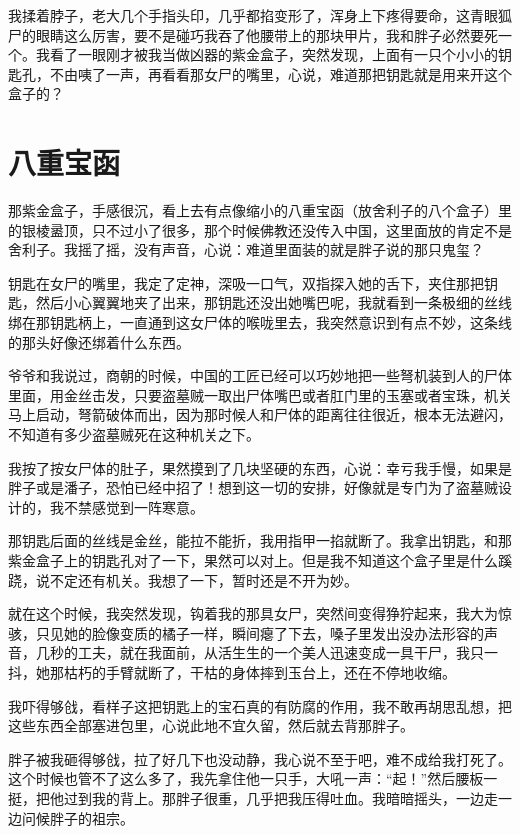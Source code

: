 我揉着脖子，老大几个手指头印，几乎都掐变形了，浑身上下疼得要命，这青眼狐尸的眼睛这么厉害，要不是碰巧我吞了他腰带上的那块甲片，我和胖子必然要死一个。我看了一眼刚才被我当做凶器的紫金盒子，突然发现，上面有一只个小小的钥匙孔，不由咦了一声，再看看那女尸的嘴里，心说，难道那把钥匙就是用来开这个盒子的？

\chapter{八重宝函}

那紫金盒子，手感很沉，看上去有点像缩小的八重宝函（放舍利子的八个盒子）里的银棱盝顶，只不过小了很多，那个时候佛教还没传入中国，这里面放的肯定不是舍利子。我摇了摇，没有声音，心说：难道里面装的就是胖子说的那只鬼玺？

钥匙在女尸的嘴里，我定了定神，深吸一口气，双指探入她的舌下，夹住那把钥匙，然后小心翼翼地夹了出来，那钥匙还没出她嘴巴呢，我就看到一条极细的丝线绑在那钥匙柄上，一直通到这女尸体的喉咙里去，我突然意识到有点不妙，这条线的那头好像还绑着什么东西。

爷爷和我说过，商朝的时候，中国的工匠已经可以巧妙地把一些弩机装到人的尸体里面，用金丝击发，只要盗墓贼一取出尸体嘴巴或者肛门里的玉塞或者宝珠，机关马上启动，弩箭破体而出，因为那时候人和尸体的距离往往很近，根本无法避闪，不知道有多少盗墓贼死在这种机关之下。

我按了按女尸体的肚子，果然摸到了几块坚硬的东西，心说：幸亏我手慢，如果是胖子或是潘子，恐怕已经中招了！想到这一切的安排，好像就是专门为了盗墓贼设计的，我不禁感觉到一阵寒意。

那钥匙后面的丝线是金丝，能拉不能折，我用指甲一掐就断了。我拿出钥匙，和那紫金盒子上的钥匙孔对了一下，果然可以对上。但是我不知道这个盒子里是什么蹊跷，说不定还有机关。我想了一下，暂时还是不开为妙。

就在这个时候，我突然发现，钩着我的那具女尸，突然间变得狰狞起来，我大为惊骇，只见她的脸像变质的橘子一样，瞬间瘪了下去，嗓子里发出没办法形容的声音，几秒的工夫，就在我面前，从活生生的一个美人迅速变成一具干尸，我只一抖，她那枯朽的手臂就断了，干枯的身体摔到玉台上，还在不停地收缩。

我吓得够戗，看样子这把钥匙上的宝石真的有防腐的作用，我不敢再胡思乱想，把这些东西全部塞进包里，心说此地不宜久留，然后就去背那胖子。

胖子被我砸得够戗，拉了好几下也没动静，我心说不至于吧，难不成给我打死了。这个时候也管不了这么多了，我先拿住他一只手，大吼一声：“起！”然后腰板一挺，把他过到我的背上。那胖子很重，几乎把我压得吐血。我暗暗摇头，一边走一边问候胖子的祖宗。

